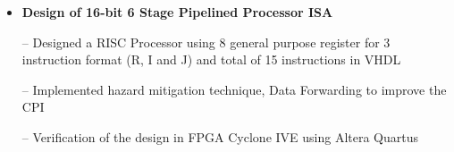 \documentclass{article}
\newcommand{\hilight}[1]{\colorbox{light-gray}{#1}}
\def\vsp{4pt}
\begin{document}
\begin{itemize}
\item \textbf{Design of 16-bit 6 Stage Pipelined Processor ISA} %

\item[--] Designed a RISC Processor using 8 general purpose register for 3 instruction format (R, I and J) and
total of 15 instructions in VHDL
\item[--] Implemented hazard mitigation technique, Data Forwarding to improve the CPI
\item[--] Verification of the design in FPGA Cyclone IVE using Altera Quartus

\end{itemize}
\vspace{-3mm}






\end{document}
